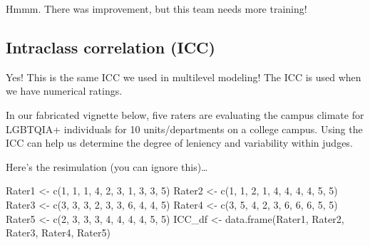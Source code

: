\documentclass[
  english,
]{book}
\newenvironment{Shaded}{\begin{snugshade}}{\end{snugshade}}
\newcommand{\DecValTok}[1]{\textcolor[rgb]{0.00,0.00,0.81}{#1}}
\newcommand{\FunctionTok}[1]{\textcolor[rgb]{0.00,0.00,0.00}{#1}}
\newcommand{\NormalTok}[1]{#1}
\newcommand{\OtherTok}[1]{\textcolor[rgb]{0.56,0.35,0.01}{#1}}
\begin{document}
Hmmm. There was improvement, but this team needs more training!

\hypertarget{intraclass-correlation-icc}{%
\subsection{Intraclass correlation (ICC)}\label{intraclass-correlation-icc}}

Yes! This is the same ICC we used in multilevel modeling! The ICC is used when we have numerical ratings.

In our fabricated vignette below, five raters are evaluating the campus climate for LGBTQIA+ individuals for 10 units/departments on a college campus. Using the ICC can help us determine the degree of leniency and variability within judges.

Here's the resimulation (you can ignore this)\ldots{}

\begin{Shaded}
\begin{Highlighting}[]
\NormalTok{Rater1 }\OtherTok{\textless{}{-}} \FunctionTok{c}\NormalTok{(}\DecValTok{1}\NormalTok{, }\DecValTok{1}\NormalTok{, }\DecValTok{1}\NormalTok{, }\DecValTok{4}\NormalTok{, }\DecValTok{2}\NormalTok{, }\DecValTok{3}\NormalTok{, }\DecValTok{1}\NormalTok{, }\DecValTok{3}\NormalTok{, }\DecValTok{3}\NormalTok{, }\DecValTok{5}\NormalTok{)}
\NormalTok{Rater2 }\OtherTok{\textless{}{-}} \FunctionTok{c}\NormalTok{(}\DecValTok{1}\NormalTok{, }\DecValTok{1}\NormalTok{, }\DecValTok{2}\NormalTok{, }\DecValTok{1}\NormalTok{, }\DecValTok{4}\NormalTok{, }\DecValTok{4}\NormalTok{, }\DecValTok{4}\NormalTok{, }\DecValTok{4}\NormalTok{, }\DecValTok{5}\NormalTok{, }\DecValTok{5}\NormalTok{)}
\NormalTok{Rater3 }\OtherTok{\textless{}{-}} \FunctionTok{c}\NormalTok{(}\DecValTok{3}\NormalTok{, }\DecValTok{3}\NormalTok{, }\DecValTok{3}\NormalTok{, }\DecValTok{2}\NormalTok{, }\DecValTok{3}\NormalTok{, }\DecValTok{3}\NormalTok{, }\DecValTok{6}\NormalTok{, }\DecValTok{4}\NormalTok{, }\DecValTok{4}\NormalTok{, }\DecValTok{5}\NormalTok{)}
\NormalTok{Rater4 }\OtherTok{\textless{}{-}} \FunctionTok{c}\NormalTok{(}\DecValTok{3}\NormalTok{, }\DecValTok{5}\NormalTok{, }\DecValTok{4}\NormalTok{, }\DecValTok{2}\NormalTok{, }\DecValTok{3}\NormalTok{, }\DecValTok{6}\NormalTok{, }\DecValTok{6}\NormalTok{, }\DecValTok{6}\NormalTok{, }\DecValTok{5}\NormalTok{, }\DecValTok{5}\NormalTok{)}
\NormalTok{Rater5 }\OtherTok{\textless{}{-}} \FunctionTok{c}\NormalTok{(}\DecValTok{2}\NormalTok{, }\DecValTok{3}\NormalTok{, }\DecValTok{3}\NormalTok{, }\DecValTok{3}\NormalTok{, }\DecValTok{4}\NormalTok{, }\DecValTok{4}\NormalTok{, }\DecValTok{4}\NormalTok{, }\DecValTok{4}\NormalTok{, }\DecValTok{5}\NormalTok{, }\DecValTok{5}\NormalTok{)}
\NormalTok{ICC\_df }\OtherTok{\textless{}{-}} \FunctionTok{data.frame}\NormalTok{(Rater1, Rater2, Rater3, Rater4, Rater5)}
\end{Highlighting}
\end{Shaded}
\end{document}
